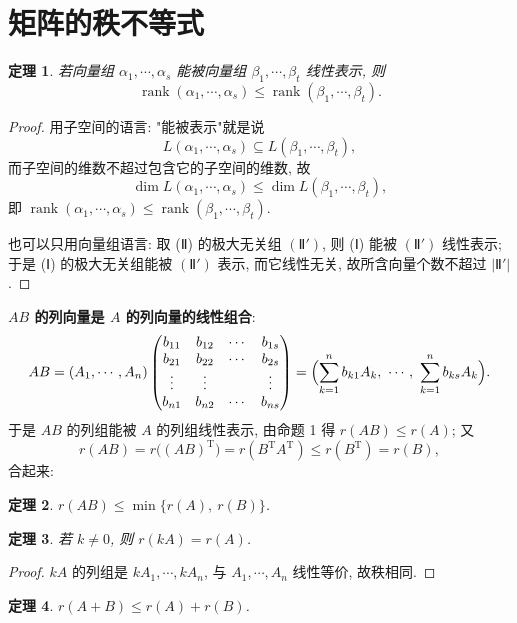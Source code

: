 \documentclass[UTF8,11pt]{ctexart}
\theoremstyle{cnthm}
\newtheorem{thm}{定理}[section]
\begin{document}
\section{矩阵的秩不等式}

\begin{thm}
若向量组 $\alpha_1,\cdots,\alpha_s$ 能被向量组 $\beta_1,\cdots,\beta_t$ 线性表示, 则
\[
\operatorname{rank}(\alpha_1,\cdots,\alpha_s)\leq\operatorname{rank}(\beta_1,\cdots,\beta_t).
\]
\end{thm}

\begin{proof}
用子空间的语言: "能被表示"就是说
\[
L(\alpha_1,\cdots,\alpha_s)\subseteq L(\beta_1,\cdots,\beta_t),
\]
而子空间的维数不超过包含它的子空间的维数, 故
\[
\dim L(\alpha_1,\cdots,\alpha_s)\leq\dim L(\beta_1,\cdots,\beta_t),
\]
即 $\operatorname{rank}(\alpha_1,\cdots,\alpha_s)\leq\operatorname{rank}(\beta_1,\cdots,\beta_t)$.

也可以只用向量组语言: 取 (Ⅱ) 的极大无关组 $(\text{Ⅱ}')$, 则 (Ⅰ) 能被 $(\text{Ⅱ}')$ 线性表示; 于是 (Ⅰ) 的极大无关组能被 $(\text{Ⅱ}')$ 表示, 而它线性无关, 故所含向量个数不超过 $|\text{Ⅱ}'|$.
\end{proof}

\textbf{$AB$ 的列向量是 $A$ 的列向量的线性组合}:
\[
AB=(A_1,\cdots,A_n)
\begin{pmatrix}b_{11}&b_{12}&\cdots&b_{1s}\\
b_{21}&b_{22}&\cdots&b_{2s}\\
\vdots&\vdots&&\vdots\\
b_{n1}&b_{n2}&\cdots&b_{ns}\end{pmatrix}
=\Bigl(\sum_{k=1}^{n}b_{k1}A_k,\ \cdots,\ \sum_{k=1}^{n}b_{ks}A_k\Bigr).
\]
于是 $AB$ 的列组能被 $A$ 的列组线性表示, 由命题 1 得 $r(AB)\leq r(A)$; 又
\[
r(AB)=r\bigl((AB)^{\mathrm T}\bigr)=r(B^{\mathrm T}A^{\mathrm T})\leq r(B^{\mathrm T})=r(B),
\]
合起来:

\begin{thm}
$r(AB)\leq\min\{r(A),\ r(B)\}$.
\end{thm}

\begin{thm}
若 $k\neq0$, 则 $r(kA)=r(A)$.
\end{thm}

\begin{proof}
$kA$ 的列组是 $kA_1,\cdots,kA_n$, 与 $A_1,\cdots,A_n$ 线性等价, 故秩相同.
\end{proof}

\begin{thm}
$r(A+B)\leq r(A)+r(B)$.
\end{thm}
\end{document}
